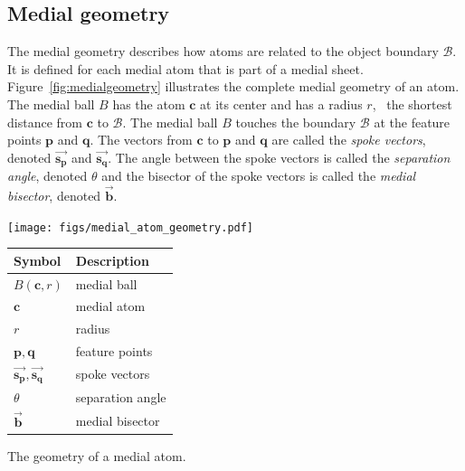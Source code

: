 \subsection{Medial geometry}
The medial geometry describes how atoms are related to the object boundary $\mathcal{B}$. 
It is defined for each medial atom that is part of a medial sheet. 
Figure~\ref{fig:medialgeometry} illustrates the complete medial geometry of an atom.
The medial ball $B$ has the atom $\mathbf{c}$ at its center and has a radius $r$, \ie\ the shortest distance from $\mathbf{c}$ to $\mathcal{B}$.
The medial ball $B$ touches the boundary $\mathcal{B}$ at the feature points $\mathbf{p}$ and $\mathbf{q}$.
The vectors from $\mathbf{c}$ to $\mathbf{p}$ and $\mathbf{q}$ are called the \emph{spoke vectors}, denoted $\vec{\mathbf{s_{p}}}$ and $\vec{\mathbf{s_{q}}}$. 
The angle between the spoke vectors is called the \emph{separation angle}, denoted $\theta$ and the bisector of the spoke vectors is called the \emph{medial bisector}, denoted $\vec{\mathbf{b}}$.

\begin{marginfigure}
	\centering
	\begin{minipage}[c]{\linewidth}
		\texttt{[image: figs/medial\_atom\_geometry.pdf]}
		\vspace{0.1em}
	\end{minipage}
	\begin{minipage}[c]{\textwidth}
		\centering
		\begin{tabular}{ll}
			\toprule
			Symbol & Description \\
			\midrule
			$B(\mathbf{c},r)$& medial ball\\
			$\mathbf{c}$ & medial atom\\
			$r$ & radius\\
			$\mathbf{p}, \mathbf{q}$ & feature points\\
			$\vec{\mathbf{s_{p}}}, \vec{\mathbf{s_{q}}}$ & spoke vectors\\
			$\theta$ & separation angle\\
			$\vec{\mathbf{b}}$ & medial bisector\\
			\bottomrule
		\end{tabular}
	\end{minipage}
	\caption{The geometry of a medial atom.}%
	\label{fig:medialgeometry}
\end{marginfigure}


